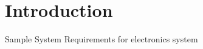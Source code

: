 \newcommand{\myTitle}{Sample System Requirements}






\tableofcontents

\chapter{Introduction}
Sample System Requirements for electronics system




